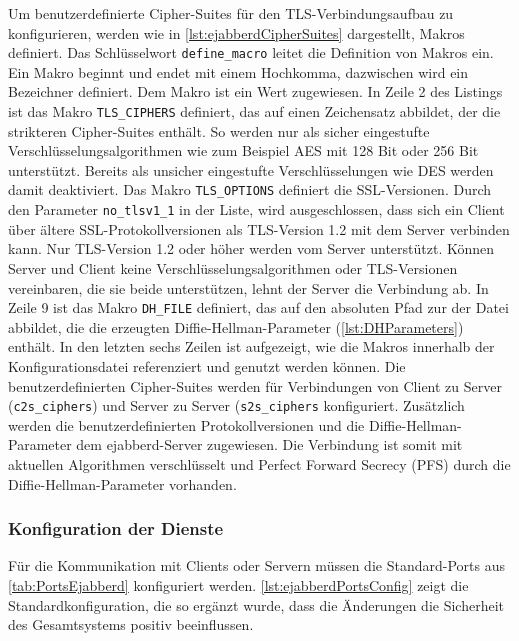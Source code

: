 \documentclass[a4paper,titlepage,halfparskip,12pt]{scrreprt}
\begin{document}
\begin{onehalfspacing}
Um benutzerdefinierte Cipher-Suites für den \ac{TLS}-Verbindungsaufbau zu konfigurieren, werden wie in \autoref{lst:ejabberdCipherSuites} dargestellt, Makros definiert. Das Schlüsselwort \texttt{define\_macro} leitet die Definition von Makros ein. Ein Makro beginnt und endet mit einem Hochkomma, dazwischen wird ein Bezeichner definiert. Dem Makro ist ein Wert zugewiesen. In Zeile 2 des Listings ist das Makro \texttt{TLS\_CIPHERS} definiert, das auf einen Zeichensatz abbildet, der die strikteren Cipher-Suites enthält. So werden nur als sicher eingestufte Verschlüsselungsalgorithmen wie zum Beispiel \ac{AES} mit 128 Bit oder 256 Bit unterstützt. Bereits als unsicher eingestufte Verschlüsselungen wie \ac{DES} werden damit deaktiviert. Das Makro \texttt{TLS\_OPTIONS} definiert die \ac{SSL}-Versionen. Durch den Parameter \texttt{no\_tlsv1\_1} in der Liste, wird ausgeschlossen, dass sich ein Client über ältere \ac{SSL}-Protokollversionen als \ac{TLS}-Version 1.2 mit dem Server verbinden kann. Nur \ac{TLS}-Version 1.2 oder höher werden vom Server unterstützt. Können Server und Client keine Verschlüsselungsalgorithmen oder \ac{TLS}-Versionen vereinbaren, die sie beide unterstützen, lehnt der Server die Verbindung ab. In Zeile 9 ist das Makro \texttt{DH\_FILE} definiert, das auf den absoluten Pfad zur der Datei abbildet, die die erzeugten Diffie-Hellman-Parameter (\autoref{lst:DHParameters}) enthält. In den letzten sechs Zeilen ist aufgezeigt, wie die Makros innerhalb der Konfigurationsdatei referenziert und genutzt werden können. Die benutzerdefinierten Cipher-Suites werden für Verbindungen von Client zu Server (\texttt{c2s\_ciphers}) und Server zu Server (\texttt{s2s\_ciphers} konfiguriert. Zusätzlich werden die benutzerdefinierten Protokollversionen und die Diffie-Hellman-Parameter dem ejabberd-Server zugewiesen. Die Verbindung ist somit mit aktuellen Algorithmen verschlüsselt und Perfect Forward Secrecy (\ac{PFS}) durch die Diffie-Hellman-Parameter vorhanden.

\subsubsection*{Konfiguration der Dienste}

Für die Kommunikation mit Clients oder Servern müssen die Standard-Ports aus \autoref{tab:PortsEjabberd} konfiguriert werden. \autoref{lst:ejabberdPortsConfig} zeigt die Standardkonfiguration, die so ergänzt wurde, dass die Änderungen die Sicherheit des Gesamtsystems positiv beeinflussen.


\end{onehalfspacing}
\end{document}
